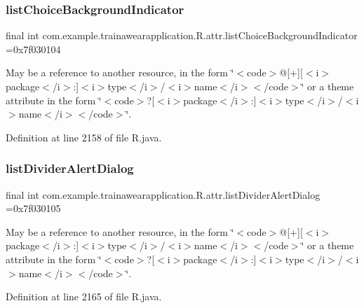 \subsubsection{\texorpdfstring{listChoiceBackgroundIndicator}{listChoiceBackgroundIndicator}}
{\footnotesize\ttfamily final int com.\+example.\+trainawearapplication.\+R.\+attr.\+list\+Choice\+Background\+Indicator =0x7f030104\hspace{0.3cm}{\ttfamily [static]}}

May be a reference to another resource, in the form \char`\"{}$<$code$>$@\mbox{[}+\mbox{]}\mbox{[}$<$i$>$package$<$/i$>$\+:\mbox{]}$<$i$>$type$<$/i$>$/$<$i$>$name$<$/i$>$$<$/code$>$\char`\"{} or a theme attribute in the form \char`\"{}$<$code$>$?\mbox{[}$<$i$>$package$<$/i$>$\+:\mbox{]}$<$i$>$type$<$/i$>$/$<$i$>$name$<$/i$>$$<$/code$>$\char`\"{}. 

Definition at line 2158 of file R.\+java.

\mbox{\label{classcom_1_1example_1_1trainawearapplication_1_1_r_1_1attr_a12e5a93ccd5f94529cbbd425a659f804}} 
\subsubsection{\texorpdfstring{listDividerAlertDialog}{listDividerAlertDialog}}
{\footnotesize\ttfamily final int com.\+example.\+trainawearapplication.\+R.\+attr.\+list\+Divider\+Alert\+Dialog =0x7f030105\hspace{0.3cm}{\ttfamily [static]}}

May be a reference to another resource, in the form \char`\"{}$<$code$>$@\mbox{[}+\mbox{]}\mbox{[}$<$i$>$package$<$/i$>$\+:\mbox{]}$<$i$>$type$<$/i$>$/$<$i$>$name$<$/i$>$$<$/code$>$\char`\"{} or a theme attribute in the form \char`\"{}$<$code$>$?\mbox{[}$<$i$>$package$<$/i$>$\+:\mbox{]}$<$i$>$type$<$/i$>$/$<$i$>$name$<$/i$>$$<$/code$>$\char`\"{}. 

Definition at line 2165 of file R.\+java.

\mbox{\label{classcom_1_1example_1_1trainawearapplication_1_1_r_1_1attr_a5186e88f3a8d2f47a984b3c4abdf950f}} 
